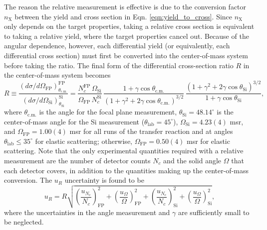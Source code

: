 The reason the relative measurement is effective is due to the conversion factor $n_{\mathrm{X}}$ between the yield and cross section in Eqn. \ref{eqn:yield_to_cross}. Since $n_{\mathrm{X}}$ only depends on the target properties, taking a relative cross section is equivalent to taking a relative yield, where the target properties cancel out. Because of the angular dependence, however, each differential yield (or equivalently, each differential cross section) must first be converted into the center-of-mass system before taking the ratio. The final form of the differential cross-section ratio $R$ in the center-of-mass system becomes
\begin{equation} \label{eqn:cross_ratio}
R \equiv \frac{\left( d\sigma/d\Omega_{\mathrm{FP}} \right)^{\mathrm{FP}}_{\theta_{\mathrm{c.m.}}}}{\left( d\sigma/d\Omega_{\mathrm{Si}} \right)^{\mathrm{Si}}_{\theta_{\mathrm{Si}}}} = \frac{N^{\mathrm{FP}}_{c} \, \Omega_{\mathrm{Si}}}{\Omega_{\mathrm{FP}} \, N^{\mathrm{Si}}_{c}} \, \frac{1 + \gamma \cos \theta_{\mathrm{c.m.}}}{\left( 1 + \gamma^{2} + 2 \gamma \cos \theta_{\mathrm{c.m.}} \right)^{3/2}} \, \frac{\left( 1 + \gamma^{2} + 2 \gamma \cos \theta_{\mathrm{Si}} \right)^{3/2}}{1 + \gamma \cos \theta_{\mathrm{Si}}},
\end{equation}
where $\theta_{\mathrm{c.m.}}$ is the angle for the focal plane measurement, $\theta_{\mathrm{Si}} = 48.14^{\circ}$ is the center-of-mass angle for the Si measurement ($\theta_{\mathrm{lab}} = 45^{\circ}$), $\Omega_{\mathrm{Si}} = 4.23(4)$ msr, and $\Omega_{\mathrm{FP}} = 1.00(4)$ msr for all runs of the transfer reaction and at angles $\theta_{\mathrm{lab}} \leq 35^{\circ}$ for elastic scattering; otherwise, $\Omega_{\mathrm{FP}} = 0.50(4)$ msr for elastic scattering. Note that the only experimental quantities required with a relative measurement are the number of detector counts $N_{c}$ and the solid angle $\Omega$ that each detector covers, in addition to the quantities making up the center-of-mass conversion. The $u_{R}$ uncertainty is found to be
\begin{equation}
u_{R} = R \sqrt{\left( \frac{u_{N_{c}}}{N_{c}} \right)^{2}_{\mathrm{FP}} + \left( \frac{u_{\Omega}}{\Omega} \right)^{2}_{\mathrm{FP}} + \left( \frac{u_{N_{c}}}{N_{c}} \right)^{2}_{\mathrm{Si}} + \left( \frac{u_{\Omega}}{\Omega} \right)^{2}_{\mathrm{Si}}},
\end{equation}
where the uncertainties in the angle measurement and $\gamma$ are sufficiently small to be neglected.


